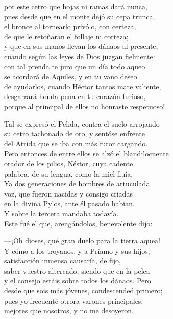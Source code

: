 por este cetro que hojas ni ramas dará nunca,\\
pues desde que en el monte dejó su cepa trunca,\\
el bronce al tornearlo privólo, con certeza,\\
de que le retoñaran el follaje ni corteza;\\
y que en sus manos llevan los dánaos al presente,\\
cuando según las leyes de Dios juzgan fielmente:\\
con tal prenda te juro que un día todo aqueo\\
se acordará de Aquiles, y en tu vano deseo\\
de ayudarlos, cuando Héctor tantos mate valiente,\\
desgarrará honda pena en tu corazón furioso,\\
porque al principal de ellos no honraste respetuoso!\par
Tal se expresó el Pelida, contra el suelo arrojando\\
su cetro tachonado de oro, y sentóse enfrente\\
del Atrida que se iba con más furor cargando.\\
Pero entonces de entre ellos se alzó el blandilocuente\\
orador de los pilios, Néstor, cuya cadente\\
palabra, de su lengua, como la miel fluía.\\
Ya dos generaciones de hombres de artuculada\\
voz, que fueron nacidas y consigo criadas\\
en la divina Pylos, ante él pasado habían.\\
Y sobre la tercera mandaba todavía.\\
Este fué el que, arengándolos, benevolente dijo:\par
---¡Oh dioses, qué gran duelo para la tierra aquea!\\
Y cómo a los troyanos, y a Príamo y sus hijos,\\
satisfacción inmensa causaría, de fijo,\\
saber vuestro altercado, siendo que en la pelea\\
y el consejo estáis sobre todos los dánaos. Pero\\
desde que sois más jóvenes, condescended primero;\\
pues yo frecuenté otrora varones principales,\\
mejores que nosotros, y no me desoyeron.\\
